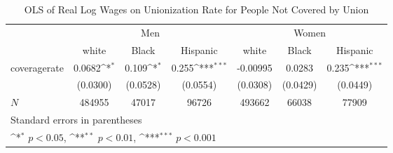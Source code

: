\begin{table}[htbp]\centering
\def\sym#1{\ifmmode^{#1}\else\(^{#1}\)\fi}
\caption{OLS of Real Log Wages on Unionization Rate for People Not Covered by Union}
\begin{tabular}{l*{6}{c}}
\hline\hline
            &\multicolumn{3}{c}{Men}                                          &\multicolumn{3}{c}{Women}                                        \\\cmidrule(lr){2-4}\cmidrule(lr){5-7}
            &\multicolumn{1}{c}{white}&\multicolumn{1}{c}{Black}&\multicolumn{1}{c}{Hispanic}&\multicolumn{1}{c}{white}&\multicolumn{1}{c}{Black}&\multicolumn{1}{c}{Hispanic}\\
\hline
coveragerate&      0.0682\sym{*}  &       0.109\sym{*}  &       0.255\sym{***}&    -0.00995         &      0.0283         &       0.235\sym{***}\\
            &    (0.0300)         &    (0.0528)         &    (0.0554)         &    (0.0308)         &    (0.0429)         &    (0.0449)         \\
\hline
\(N\)       &      484955         &       47017         &       96726         &      493662         &       66038         &       77909         \\
\hline\hline
\multicolumn{7}{l}{\footnotesize Standard errors in parentheses}\\
\multicolumn{7}{l}{\footnotesize \sym{*} \(p<0.05\), \sym{**} \(p<0.01\), \sym{***} \(p<0.001\)}\\
\end{tabular}
\end{table}
